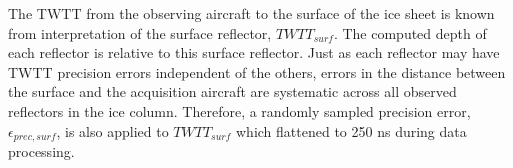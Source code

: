 
The TWTT from the observing aircraft to the surface of the ice sheet is known from interpretation of the surface reflector, $TWTT_{surf}$. The computed depth of each reflector is relative to this surface reflector. Just as each reflector may have TWTT precision errors independent of the others, errors in the distance between the surface and the acquisition aircraft are systematic across all observed reflectors in the ice column. Therefore, a randomly sampled precision error, $\epsilon_{prec,surf}$, is also applied to $TWTT_{surf}$ which flattened to 250 ns during data processing. 







